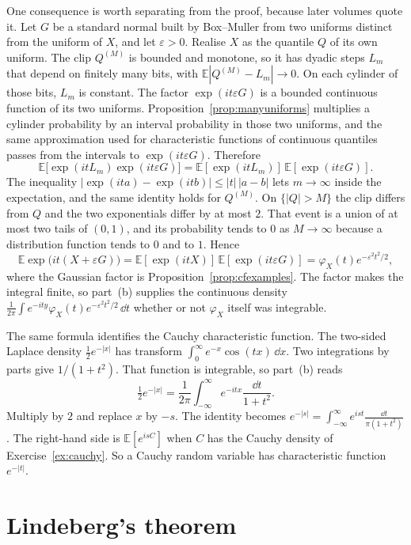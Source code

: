 One consequence is worth separating from the proof, because later volumes quote it. Let $G$ be a standard normal built by Box--Muller from two uniforms distinct from the uniform of $X$, and let $\varepsilon>0$. Realise $X$ as the quantile $Q$ of its own uniform. The clip $Q^{(M)}$ is bounded and monotone, so it has dyadic steps $L_m$ that depend on finitely many bits, with $\mathbb E|Q^{(M)}-L_m|\to0$. On each cylinder of those bits, $L_m$ is constant. The factor $\exp(it\varepsilon G)$ is a bounded continuous function of its two uniforms. Proposition~\ref{prop:manyuniforms} multiplies a cylinder probability by an interval probability in those two uniforms, and the same approximation used for characteristic functions of continuous quantiles passes from the intervals to $\exp(it\varepsilon G)$. Therefore
\[
 \mathbb E\bigl[\exp(it L_m)\exp(it\varepsilon G)\bigr]
 =\mathbb E[\exp(it L_m)]\,\mathbb E[\exp(it\varepsilon G)].
\]
The inequality $|\exp(it a)-\exp(it b)|\le|t|\,|a-b|$ lets $m\to\infty$ inside the expectation, and the same identity holds for $Q^{(M)}$. On $\{|Q|>M\}$ the clip differs from $Q$ and the two exponentials differ by at most $2$. That event is a union of at most two tails of $(0,1)$, and its probability tends to $0$ as $M\to\infty$ because a distribution function tends to $0$ and to $1$. Hence
\[
 \mathbb E\exp\bigl(it(X+\varepsilon G)\bigr)
 =\mathbb E[\exp(it X)]\,\mathbb E[\exp(it\varepsilon G)]
 =\varphi_X(t)e^{-\varepsilon^2 t^2/2},
\]
where the Gaussian factor is Proposition~\ref{prop:cfexamples}. The factor makes the integral finite, so part~(b) supplies the continuous density $\frac1{2\pi}\int e^{-ity}\varphi_X(t)e^{-\varepsilon^2 t^2/2}\,\dd t$ whether or not $\varphi_X$ itself was integrable.

The same formula identifies the Cauchy characteristic function. The two-sided Laplace density $\frac12 e^{-|x|}$ has transform $\int_0^\infty e^{-x}\cos(tx)\,\dd x$. Two integrations by parts give $1/(1+t^2)$. That function is integrable, so part~(b) reads
\[
 \tfrac12 e^{-|x|}=\frac1{2\pi}\int_{-\infty}^{\infty}e^{-itx}\frac{\dd t}{1+t^2}.
\]
Multiply by $2$ and replace $x$ by $-s$. The identity becomes $e^{-|s|}=\int_{-\infty}^{\infty}e^{ist}\frac{\dd t}{\pi(1+t^2)}$. The right-hand side is $\mathbb E[e^{isC}]$ when $C$ has the Cauchy density of Exercise~\ref{ex:cauchy}. So a Cauchy random variable has characteristic function $e^{-|t|}$.

\section{Lindeberg's theorem}

